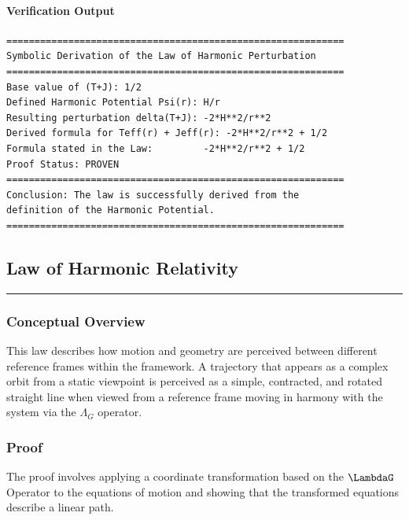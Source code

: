 \paragraph{Verification Output}
\begin{verbatim}
============================================================
Symbolic Derivation of the Law of Harmonic Perturbation
============================================================
Base value of (T+J): 1/2
Defined Harmonic Potential Psi(r): H/r
Resulting perturbation delta(T+J): -2*H**2/r**2
Derived formula for Teff(r) + Jeff(r): -2*H**2/r**2 + 1/2
Formula stated in the Law:         -2*H**2/r**2 + 1/2
Proof Status: PROVEN
============================================================
Conclusion: The law is successfully derived from the
definition of the Harmonic Potential.
============================================================
\end{verbatim}


\subsection*{Law of Harmonic Relativity}
\hrule
\vspace{0.3cm}
\vspace{0.5cm}

\subsubsection*{Conceptual Overview}
This law describes how motion and geometry are perceived between different reference frames within the framework. A trajectory that appears as a complex orbit from a static viewpoint is perceived as a simple, contracted, and rotated straight line when viewed from a reference frame moving in harmony with the system via the $\Lambda_G$ operator.

\subsubsection*{Proof}
The proof involves applying a coordinate transformation based on the $\LambdaG$ Operator to the equations of motion and showing that the transformed equations describe a linear path.

